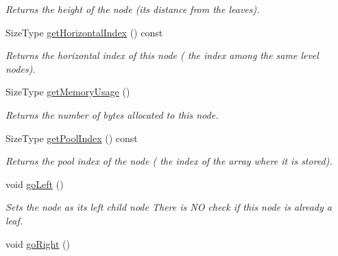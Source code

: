 \begin{DoxyCompactItemize}
\begin{DoxyCompactList}\small\item\em Returns the height of the node (its distance from the leaves). \item\end{DoxyCompactList}\item 
SizeType \hyperlink{class_complete_binary_tree_1_1_node_a36d28454d7336f2366b784335169a46c}{getHorizontalIndex} () const 
\begin{DoxyCompactList}\small\item\em Returns the horizontal index of this node ( the index among the same level nodes). \item\end{DoxyCompactList}\item 
SizeType \hyperlink{class_complete_binary_tree_1_1_node_a3735cf9d8680a7aeb0f88cf4f7672921}{getMemoryUsage} ()
\begin{DoxyCompactList}\small\item\em Returns the number of bytes allocated to this node. \item\end{DoxyCompactList}\item 
SizeType \hyperlink{class_complete_binary_tree_1_1_node_a067ae41ed3433d842176ddd96edbfeb7}{getPoolIndex} () const 
\begin{DoxyCompactList}\small\item\em Returns the pool index of the node ( the index of the array where it is stored). \item\end{DoxyCompactList}\item 
\hypertarget{class_complete_binary_tree_1_1_node_ab90f908781f56a1a41fc4ac5c3943f9b}{
void \hyperlink{class_complete_binary_tree_1_1_node_ab90f908781f56a1a41fc4ac5c3943f9b}{goLeft} ()}
\label{class_complete_binary_tree_1_1_node_ab90f908781f56a1a41fc4ac5c3943f9b}

\begin{DoxyCompactList}\small\item\em Sets the node as its left child node There is NO check if this node is already a leaf. \item\end{DoxyCompactList}\item 
\hypertarget{class_complete_binary_tree_1_1_node_a79ecd13e917240e2986793cb40db58f5}{
void \hyperlink{class_complete_binary_tree_1_1_node_a79ecd13e917240e2986793cb40db58f5}{goRight} ()}
\label{class_complete_binary_tree_1_1_node_a79ecd13e917240e2986793cb40db58f5}


\end{DoxyCompactItemize}
